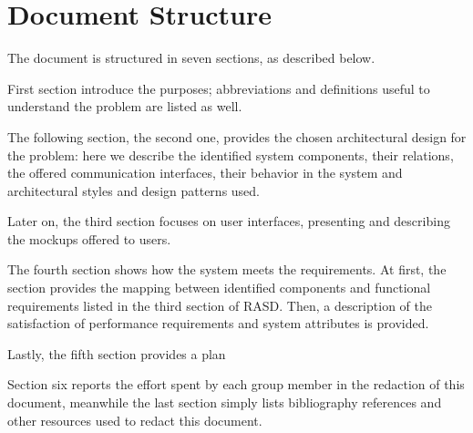 \section{Document Structure}
\label{sec:doc_structure}%
The document is structured in seven sections, as described below.

First section introduce the purposes;
abbreviations and definitions useful to understand the problem are listed as well.

The following section, the second one, provides the chosen architectural design for the problem: here we describe
the identified system components, their relations, the offered communication interfaces, their behavior in the system
and architectural styles and design patterns used.

Later on, the third section focuses on user interfaces, presenting and describing the mockups offered to users.

The fourth section shows how the system meets the requirements.
At first, the section provides the mapping between identified components and functional requirements listed in the third
section of RASD\@.
Then, a description of the satisfaction of performance requirements and system attributes is provided.

Lastly, the fifth section provides a plan %

Section six reports the effort spent by each group member in the redaction of this document, meanwhile the last
section simply lists bibliography references and other resources used to redact this document.
